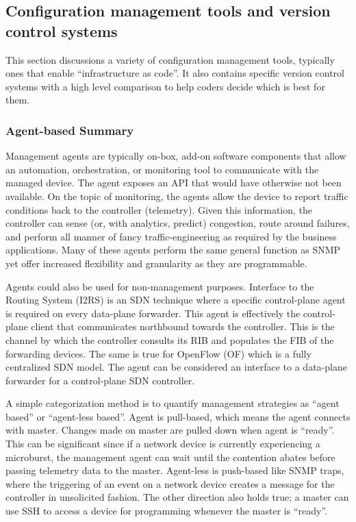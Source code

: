 \subsection{Configuration management tools and version control systems}
This section discussions a variety of configuration management tools, typically
ones that enable ``infrastructure as code''. It also contains specific
version control systems with a high level comparison to help coders decide
which is best for them.

\subsubsection{Agent-based Summary}
Management agents are typically on-box, add-on software components that allow
an automation, orchestration, or monitoring tool to communicate with the
managed device. The agent exposes an API that would have otherwise not been
available. On the topic of monitoring, the agents allow the device to report
traffic conditions back to the controller (telemetry). Given this information,
the controller can sense (or, with analytics, predict) congestion, route
around failures, and perform all manner of fancy traffic-engineering as
required by the business applications. Many of these agents perform the same
general function as SNMP yet offer increased flexibility and granularity as
they are programmable.

Agents could also be used for non-management purposes. Interface to the
Routing System (I2RS) is an SDN technique where a specific control-plane agent
is required on every data-plane forwarder. This agent is effectively the
control-plane client that communicates northbound towards the controller. This
is the channel by which the controller consults its RIB and populates the FIB
of the forwarding devices. The same is true for OpenFlow (OF) which is a fully
centralized SDN model. The agent can be considered an interface to a
data-plane forwarder for a control-plane SDN controller.

A simple categorization method is to quantify management strategies as ``agent
based'' or ``agent-less based''. Agent is pull-based, which means the agent
connects with master. Changes made on master are pulled down when agent is
``ready''. This can be significant since if a network device is currently
experiencing a microburst, the management agent can wait until the contention
abates before passing telemetry data to the master. Agent-less is push-based
like SNMP traps, where the triggering of an event on a network device creates
a message for the controller in unsolicited fashion. The other direction also
holds true; a master can use SSH to access a device for programming whenever
the master is ``ready''.

